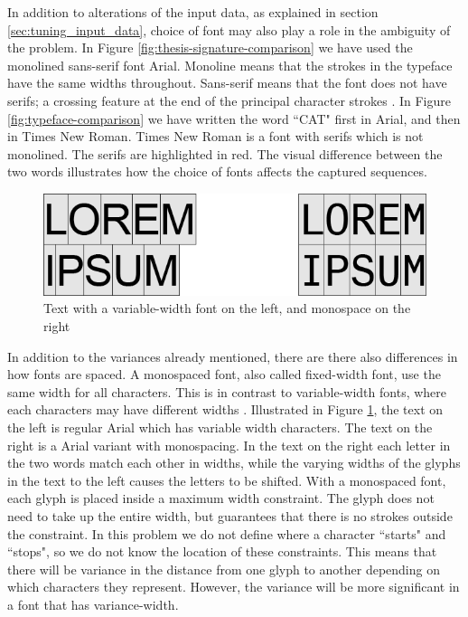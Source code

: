 In addition to alterations of the input data, as explained in section \ref{sec:tuning_input_data}, choice of font may also play a role in the ambiguity of the problem. In Figure \ref{fig:thesis-signature-comparison} we have used the monolined sans-serif font Arial. Monoline means that the strokes in the typeface have the same widths throughout. Sans-serif means that the font does not have serifs; a crossing feature at the end of the principal character strokes \citep{felici2011complete}. In Figure \ref{fig:typeface-comparison} we have written the word ``CAT" first in Arial, and then in Times New Roman. Times New Roman is a font with serifs which is not monolined. The serifs are highlighted in red. The visual difference between the two words illustrates how the choice of fonts affects the captured sequences.

\begin{figure}[ht]
    \centering
    \includegraphics[width=1.0\textwidth]{fig/chapter2/regular_mono_comparison.png}
    \caption{Text with a variable-width font on the left, and monospace on the right}
    \label{fig:regular-mono-comparison}
\end{figure}

In addition to the variances already mentioned, there are there also differences in how fonts are spaced. A monospaced font, also called fixed-width font, use the same width for all characters. This is in contrast to variable-width fonts, where each characters may have different widths \citep{felici2011complete}. Illustrated in Figure \ref{fig:regular-mono-comparison}, the text on the left is regular Arial which has variable width characters. The text on the right is a Arial variant with monospacing. In the text on the right each letter in the two words match each other in widths, while the varying widths of the glyphs in the text to the left causes the letters to be shifted. With a monospaced font, each glyph is placed inside a maximum width constraint. The glyph does not need to take up the entire width, but guarantees that there is no strokes outside the constraint. In this problem we do not define where a character ``starts" and ``stops", so we do not know the location of these constraints. This means that there will be variance in the distance from one glyph to another depending on which characters they represent. However, the variance will be more significant in a font that has variance-width. 

